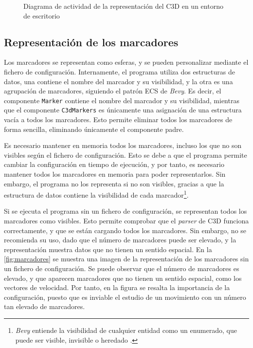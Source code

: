 \begin{figure}[H]
  \caption{Diagrama de actividad de la representación del \acs{C3D} en un entorno de escritorio}
  \label{fig:flujo}
\end{figure}

\subsection{Representación de los marcadores} \label{sec:representacion-marcadores}

Los marcadores se representan como esferas, y se pueden personalizar mediante el fichero de configuración. Internamente, el programa utiliza dos estructuras de datos, una contiene el nombre del marcador y su visibilidad, y la otra es una agrupación de marcadores, siguiendo el patrón \ac{ECS} de \textit{Bevy}. Es decir, el componente \texttt{Marker} contiene el nombre del marcador y su visibilidad, mientras que el componente \texttt{C3dMarkers} es únicamente una asignación de una estructura vacía a todos los marcadores. Esto permite eliminar todos los marcadores de forma sencilla, eliminando únicamente el componente padre.

Es necesario mantener en memoria todos los marcadores, incluso los que no son visibles según el fichero de configuración. Esto se debe a que el programa permite cambiar la configuración en tiempo de ejecución, y por tanto, es necesario mantener todos los marcadores en memoria para poder representarlos. Sin embargo, el programa no los representa si no son visibles, gracias a que la estructura de datos contiene la visibilidad de cada marcador\footnote{\textit{Bevy} entiende la visibilidad de cualquier entidad como un enumerado, que puede ser visible, invisible o heredado \autocite{VisibilityBevyRender}.}.

Si se ejecuta el programa sin un fichero de configuración, se representan todos los marcadores como visibles. Esto permite comprobar que el \textit{parser} de \ac{C3D} funciona correctamente, y que se están cargando todos los marcadores. Sin embargo, no se recomienda su uso, dado que el número de marcadores puede ser elevado, y la representación muestra datos que no tienen un sentido espacial. En la \autoref{fig:marcadores} se muestra una imagen de la representación de los marcadores sin un fichero de configuración. Se puede observar que el número de marcadores es elevado, y que aparecen marcadores que no tienen un sentido espacial, como los vectores de velocidad. Por tanto, en la figura se resalta la importancia de la configuración, puesto que es inviable el estudio de un movimiento con un número tan elevado de marcadores. 

